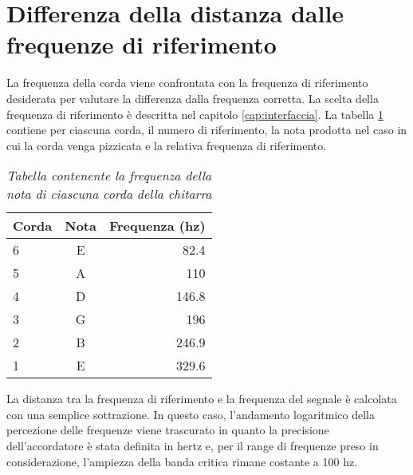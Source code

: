 \section{Differenza della distanza dalle frequenze di riferimento}\label{cap:distanza}

La frequenza della corda viene confrontata con la frequenza di riferimento desiderata per valutare la differenza dalla frequenza corretta.
La scelta della frequenza di riferimento è descritta nel capitolo \ref{cap:interfaccia}.
La tabella \ref{tab:frequenze_riferimento} contiene per ciascuna corda, il numero di riferimento, la nota prodotta nel caso in cui la corda venga pizzicata e la relativa frequenza di riferimento.

	\begin{table}[h]
	\center
	\begin{tabular}{|l|c|r|}
		\hline
		Corda	& 	Nota    & Frequenza (hz) \\
		\hline
		6	&	E	&	82.4     \\
		5	&	A	&	110      \\
		4	&	D	&	146.8    \\
		3	&	G	&	196      \\
		2	&	B	&	246.9    \\
		1	&	E	&	329.6    \\
		\hline
	\end{tabular}
	\caption{\textit{Tabella contenente la frequenza della nota di ciascuna corda della chitarra}}
	\label{tab:frequenze_riferimento}
	\end{table}

La distanza tra la frequenza di riferimento e la frequenza del segnale è calcolata con una semplice sottrazione.
In questo caso, l'andamento logaritmico della percezione delle frequenze viene trascurato in quanto la precisione dell'accordatore è stata definita in hertz e, per il range di frequenze preso in considerazione, l'ampiezza della banda critica rimane costante a 100 hz. 
